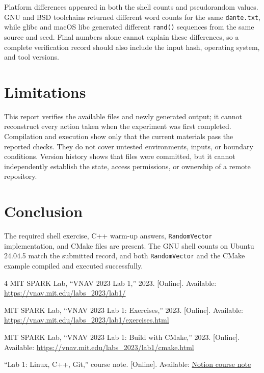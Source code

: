 \documentclass[letterpaper,10pt,conference]{ieeeconf}
\begin{document}
Platform differences appeared in both the shell counts and pseudorandom values. GNU and BSD toolchains returned different word counts for the same \texttt{dante.txt}, while glibc and macOS libc generated different \texttt{rand()} sequences from the same source and seed. Final numbers alone cannot explain these differences, so a complete verification record should also include the input hash, operating system, and tool versions.

\balance
\section{Limitations}

This report verifies the available files and newly generated output; it cannot reconstruct every action taken when the experiment was first completed. Compilation and execution show only that the current materials pass the reported checks. They do not cover untested environments, inputs, or boundary conditions. Version history shows that files were committed, but it cannot independently establish the state, access permissions, or ownership of a remote repository.

\section{Conclusion}

The required shell exercise, C++ warm-up answers, \texttt{RandomVector} implementation, and CMake files are present. The GNU shell counts on Ubuntu 24.04.5 match the submitted record, and both \texttt{RandomVector} and the CMake example compiled and executed successfully.

\begin{thebibliography}{4}
MIT SPARK Lab, ``VNAV 2023 Lab 1,'' 2023. [Online]. Available: \url{https://vnav.mit.edu/labs_2023/lab1/}

MIT SPARK Lab, ``VNAV 2023 Lab 1: Exercises,'' 2023. [Online]. Available: \url{https://vnav.mit.edu/labs_2023/lab1/exercises.html}

MIT SPARK Lab, ``VNAV 2023 Lab 1: Build with CMake,'' 2023. [Online]. Available: \url{https://vnav.mit.edu/labs_2023/lab1/cmake.html}

``Lab 1: Linux, C++, Git,'' course note. [Online]. Available: \href{https://spurious-cornflower-507.notion.site/Lab-1-Linux-C-Git-e788685e06a84200ae587ffe64258c76}{Notion course note}
\end{thebibliography}
\end{document}
